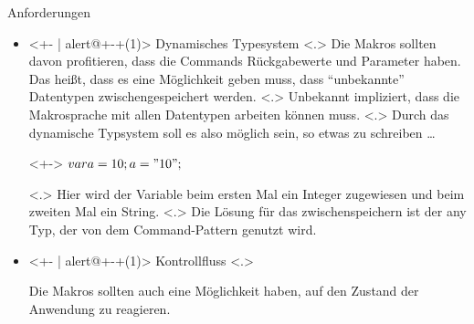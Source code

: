   \begin{frame}{Anforderungen}
    \begin{itemize}
      \item<+- | alert@+-+(1)>
        Dynamisches Typesystem
            \note[item]<.>{
              Die Makros sollten davon profitieren, dass die Commands Rückgabewerte und Parameter haben. Das heißt, dass es eine Möglichkeit geben muss, dass ``unbekannte'' Datentypen zwischengespeichert werden.
            }
            \note[item]<.>{
              Unbekannt impliziert, dass die Makrosprache mit allen Datentypen arbeiten können muss.
            }
            \note[item]<.>{
              Durch das dynamische Typsystem soll es also möglich sein, so etwas zu schreiben \ldots
            }
        \begin{uncoverenv}<+->%
          \tabto{4.6cm}
          \myMIn$var a = 10; a = "10";$
        \end{uncoverenv}
            \note[item]<.>{
              Hier wird der Variable  beim ersten Mal ein Integer zugewiesen und beim zweiten Mal ein String.
            }
            \note[item]<.>{
              Die Lösung für das zwischenspeichern ist der any Typ, der von dem Command-Pattern genutzt wird.
            }
      \item<+- | alert@+-+(1)>
        Kontrollfluss
            \note[item]<.>{
              Die Makros sollten auch eine Möglichkeit haben, auf den Zustand der Anwendung zu reagieren.

}
\end{itemize}
\end{frame}
